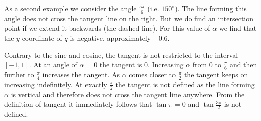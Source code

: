 \noindent As a second example we consider the angle $\frac{5 \pi}{6}$ (i.e. $150^{\circ}$). The line forming this angle does not cross the tangent line on the right. But we do find an intersection point if we extend it backwards (the dashed line). For this value of $\alpha$ we find that the $y$-coordinate of $q$ is negative, approximately $-0.6$.
\begin{center}
\end{center}
\noindent Contrary to the sine and cosine, the tangent is not restricted to the interval $[-1,1]$. At an angle of $\alpha=0$ the tangent is $0$. Increasing $\alpha$ from $0$ to $\frac{\pi}{6}$ and then further to $\frac{\pi}{4}$ increases the tangent. As $\alpha$ comes closer to $\frac{\pi}{2}$ the tangent keeps on increasing indefinitely. At exactly $\frac{\pi}{2}$ the tangent is not defined as the line forming $\alpha$ is vertical and therefore does not cross the tangent line anywhere. From the definition of tangent it immediately follows that $\tan \pi = 0$ and $\tan \frac{3 \pi}{2}$ is not defined.\\

